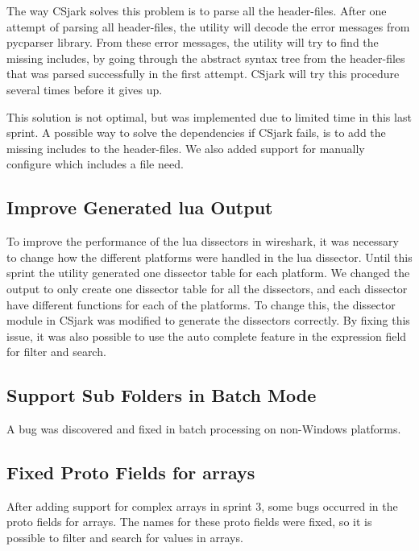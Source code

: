 The way CSjark solves this problem is to parse all the header-files. After one 
attempt of parsing all header-files, the utility will decode the error messages 
from pycparser library. From these error messages, the utility will try to 
find the missing includes, by going through the abstract syntax tree from the 
header-files that was parsed successfully in the first attempt. CSjark will 
try this procedure several times before it gives up.

This solution is not optimal, but was implemented due to limited time in this 
last sprint. A possible way to solve the dependencies if CSjark fails, is to 
add the missing includes to the header-files. We also added support for
manually configure which includes a file need.

\subsection{Improve Generated \Gls{lua} Output}
To improve the performance of the \Gls{lua} \glspl{dissector} in \Gls{wireshark}, it was 
necessary to change how the different platforms were handled in the \Gls{lua} 
\gls{dissector}. Until this sprint the \gls{utility} generated one \gls{dissector} table for 
each platform. We changed the output to only create one \gls{dissector} table for all the \glspl{dissector},
and each dissector have different functions for each of the platforms. To change this, the \gls{dissector} 
module in CSjark was modified to generate the \glspl{dissector} correctly. By fixing 
this issue, it was also possible to use the auto complete feature in the 
expression field for filter and search.

\subsection{Support Sub Folders in Batch Mode}
A bug was discovered and fixed in batch processing on non-Windows platforms.

\subsection{Fixed Proto Fields for \Glspl{array}}
After adding support for complex \glspl{array} in sprint 3, some bugs occurred in the 
proto fields for \glspl{array}. The names for these proto fields were fixed, so it is 
possible to filter and search for values in \glspl{array}. 

